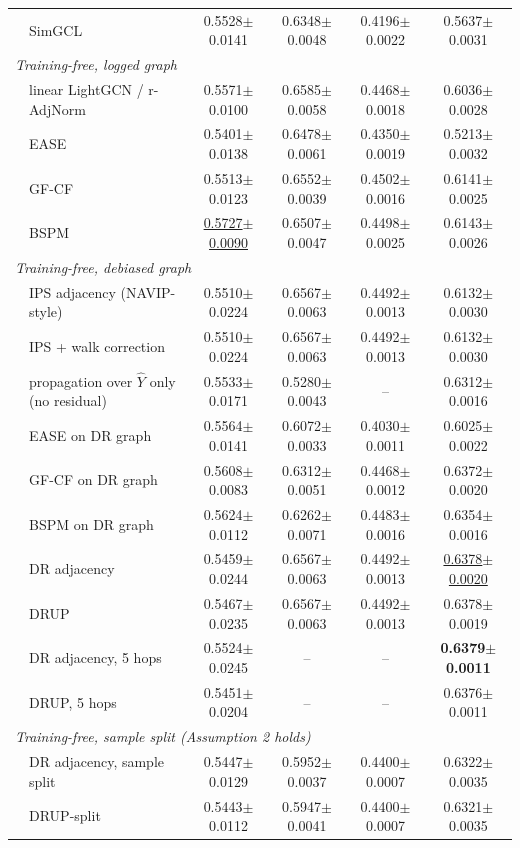 \begin{tabular}{llcccc}
 & SimGCL & 0.5528$\pm$0.0141 & 0.6348$\pm$0.0048 & 0.4196$\pm$0.0022 & 0.5637$\pm$0.0031\\
\multicolumn{6}{l}{\emph{Training-free, logged graph}}\\
 & linear LightGCN / r-AdjNorm & 0.5571$\pm$0.0100 & 0.6585$\pm$0.0058 & 0.4468$\pm$0.0018 & 0.6036$\pm$0.0028\\
 & EASE & 0.5401$\pm$0.0138 & 0.6478$\pm$0.0061 & 0.4350$\pm$0.0019 & 0.5213$\pm$0.0032\\
 & GF-CF & 0.5513$\pm$0.0123 & 0.6552$\pm$0.0039 & 0.4502$\pm$0.0016 & 0.6141$\pm$0.0025\\
 & BSPM & \underline{0.5727$\pm$0.0090} & 0.6507$\pm$0.0047 & 0.4498$\pm$0.0025 & 0.6143$\pm$0.0026\\
\multicolumn{6}{l}{\emph{Training-free, debiased graph}}\\
 & IPS adjacency (NAVIP-style) & 0.5510$\pm$0.0224 & 0.6567$\pm$0.0063 & 0.4492$\pm$0.0013 & 0.6132$\pm$0.0030\\
 & IPS + walk correction & 0.5510$\pm$0.0224 & 0.6567$\pm$0.0063 & 0.4492$\pm$0.0013 & 0.6132$\pm$0.0030\\
 & propagation over $\hat Y$ only (no residual) & 0.5533$\pm$0.0171 & 0.5280$\pm$0.0043 & -- & 0.6312$\pm$0.0016\\
 & EASE on DR graph & 0.5564$\pm$0.0141 & 0.6072$\pm$0.0033 & 0.4030$\pm$0.0011 & 0.6025$\pm$0.0022\\
 & GF-CF on DR graph & 0.5608$\pm$0.0083 & 0.6312$\pm$0.0051 & 0.4468$\pm$0.0012 & 0.6372$\pm$0.0020\\
 & BSPM on DR graph & 0.5624$\pm$0.0112 & 0.6262$\pm$0.0071 & 0.4483$\pm$0.0016 & 0.6354$\pm$0.0016\\
 & DR adjacency & 0.5459$\pm$0.0244 & 0.6567$\pm$0.0063 & 0.4492$\pm$0.0013 & \underline{0.6378$\pm$0.0020}\\
 & DRUP & 0.5467$\pm$0.0235 & 0.6567$\pm$0.0063 & 0.4492$\pm$0.0013 & 0.6378$\pm$0.0019\\
 & DR adjacency, 5 hops & 0.5524$\pm$0.0245 & -- & -- & \textbf{0.6379$\pm$0.0011}\\
 & DRUP, 5 hops & 0.5451$\pm$0.0204 & -- & -- & 0.6376$\pm$0.0011\\
\multicolumn{6}{l}{\emph{Training-free, sample split (Assumption 2 holds)}}\\
 & DR adjacency, sample split & 0.5447$\pm$0.0129 & 0.5952$\pm$0.0037 & 0.4400$\pm$0.0007 & 0.6322$\pm$0.0035\\
 & DRUP-split & 0.5443$\pm$0.0112 & 0.5947$\pm$0.0041 & 0.4400$\pm$0.0007 & 0.6321$\pm$0.0035\\
\bottomrule
\end{tabular}
